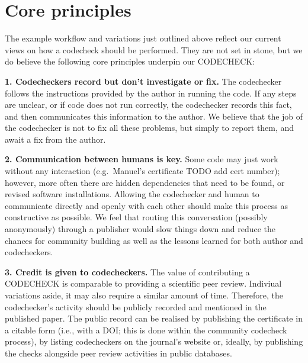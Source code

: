 \documentclass[12pt]{article}
\begin{document}
\section*{Core principles}\label{core-principles}

The example workflow and variations just outlined above reflect our current
views on how a codecheck should be performed. They are not set in
stone, but we do believe the following core principles underpin our
CODECHECK:

\textbf{1. Codecheckers record but don't investigate or fix.} The
codechecker follows the instructions provided by the author in running
the code. If any steps are unclear, or if code does not run correctly,
the codechecker records this fact, and then communicates this
information to the author. We believe that the job of the codechecker is
not to fix all these problems, but simply to report them, and await a
fix from the author.

\textbf{2. Communication between humans is key.} Some code may just work
without any interaction (e.g.~Manuel's certificate TODO add cert number); 
however, more often
there are hidden dependencies that need to be found, or revised software
installations. Allowing the codechecker and human to communicate
directly and openly with each other should make this process as
constructive as possible. We feel that routing this conversation
(possibly anonymously) through a publisher would slow things down and
reduce the chances for community building as well as the lessons learned
for both author and codecheckers.

\textbf{3. Credit is given to codecheckers.} The value of contributing a
CODECHECK is comparable to providing a scientific peer review. Indiviual
variations aside, it may also require a similar amount of time. Therefore,
the codechecker's activity should be publicly recorded and mentioned in the
published paper.
The public record can be realised by publishing the certificate in a 
citable form (i.e., with a DOI; this is done within the community codecheck
process), by listing codecheckers on the journal's website or, ideally, by
publishing the checks alongside peer review activities in public databases.
\end{document}
